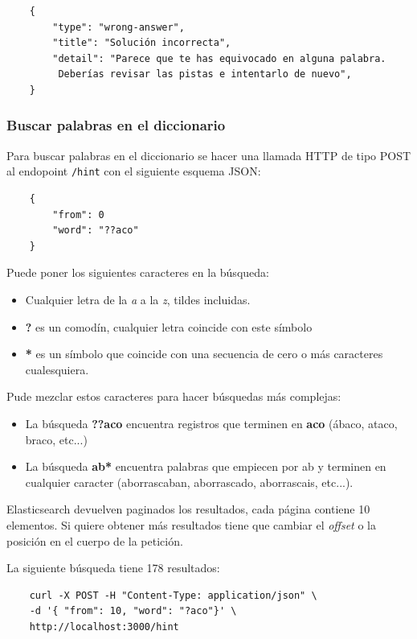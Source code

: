 \documentclass[12pt, a4paper]{article}
\begin{document}
\begin{verbatim}
	{
		"type": "wrong-answer",
		"title": "Solución incorrecta",
		"detail": "Parece que te has equivocado en alguna palabra.
		 Deberías revisar las pistas e intentarlo de nuevo",
	}
\end{verbatim}

\subsubsection{Buscar palabras en el diccionario}

Para buscar palabras en el diccionario se hacer una llamada HTTP
de tipo POST al endopoint \verb*|/hint| con el siguiente esquema
JSON:

\begin{verbatim}
	{
		"from": 0
		"word": "??aco"
	}
\end{verbatim}

Puede poner los siguientes caracteres en la búsqueda:

\begin{itemize}
	\item Cualquier letra de la \textit{a} a la \textit{z}, tildes
	incluidas.
	\item \textbf{?} es un comodín, cualquier letra coincide con
	este símbolo
	\item \textbf{*} es un símbolo que coincide con una secuencia de cero o más caracteres
	cualesquiera.
\end{itemize}

Pude mezclar estos caracteres para hacer búsquedas más complejas:

\begin{itemize}
	\item La búsqueda \textbf{??aco} encuentra registros que terminen en
		\textbf{aco} (ábaco, ataco, braco, etc...)
	\item La búsqueda \textbf{ab*} encuentra
	palabras que empiecen por ab y terminen en cualquier caracter
	(aborrascaban, aborrascado, aborrascais, etc...).
\end{itemize}


Elasticsearch devuelven paginados los resultados, cada página contiene
10 elementos. Si quiere obtener más resultados tiene que cambiar el \textit{offset} o la posición en el cuerpo de la petición.

La siguiente búsqueda tiene 178 resultados:

\begin{verbatim}
	curl -X POST -H "Content-Type: application/json" \
	-d '{ "from": 10, "word": "?aco"}' \
	http://localhost:3000/hint
\end{verbatim} 
\end{document}
